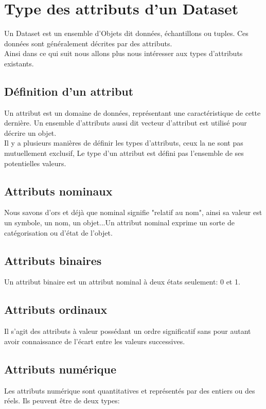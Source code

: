 \documentclass[12pt,a4paper,oneside]{book}
\begin{document}
\section{Type des attributs d'un Dataset}
Un Dataset est un ensemble d'Objets dit données, échantillons ou tuples.
 Ces données sont généralement décrites par des attributs.\\
 Ainsi dans ce qui suit nous allons plus nous intéresser aux types d'attributs existants.
 
\subsection{Définition d'un attribut}
Un attribut est un domaine de données, représentant une caractéristique de cette dernière. 
Un ensemble d'attributs aussi dit vecteur d'attribut est utilisé pour décrire un objet.\\
Il y a plusieurs manières de définir les types d'attributs, ceux la ne sont pas mutuellement exclusif,
Le type d'un attribut est défini pas l'ensemble de ses potentielles valeurs.

\subsection{Attributs nominaux}
Nous savons d'ors et déjà que nominal signifie "relatif au nom", ainsi sa valeur est un symbole, un nom, un objet...Un attribut nominal exprime un sorte de catégorisation ou d'état de l'objet.

\subsection{Attributs binaires}
Un attribut binaire est un attribut nominal à deux états seulement: 0 et 1.

\subsection{Attributs ordinaux}
Il s'agit des attributs à valeur possédant un ordre significatif sans pour autant avoir connaissance de l'écart entre les valeurs successives.

\subsection{Attributs numérique}
Les attributs numérique sont quantitatives et représentés par des entiers ou des réels. Ils peuvent être de deux types:
\end{document}
